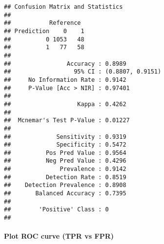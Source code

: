 \documentclass[
]{article}
\newenvironment{Shaded}{\begin{snugshade}}{\end{snugshade}}
\newcommand{\DataTypeTok}[1]{\textcolor[rgb]{0.13,0.29,0.53}{#1}}
\newcommand{\DecValTok}[1]{\textcolor[rgb]{0.00,0.00,0.81}{#1}}
\newcommand{\KeywordTok}[1]{\textcolor[rgb]{0.13,0.29,0.53}{\textbf{#1}}}
\newcommand{\NormalTok}[1]{#1}
\newcommand{\OperatorTok}[1]{\textcolor[rgb]{0.81,0.36,0.00}{\textbf{#1}}}
\newcommand{\OtherTok}[1]{\textcolor[rgb]{0.56,0.35,0.01}{#1}}
\newcommand{\StringTok}[1]{\textcolor[rgb]{0.31,0.60,0.02}{#1}}
\begin{document}
\begin{verbatim}
## Confusion Matrix and Statistics
## 
##           Reference
## Prediction    0    1
##          0 1053   48
##          1   77   58
##                                           
##                Accuracy : 0.8989          
##                  95% CI : (0.8807, 0.9151)
##     No Information Rate : 0.9142          
##     P-Value [Acc > NIR] : 0.97401         
##                                           
##                   Kappa : 0.4262          
##                                           
##  Mcnemar's Test P-Value : 0.01227         
##                                           
##             Sensitivity : 0.9319          
##             Specificity : 0.5472          
##          Pos Pred Value : 0.9564          
##          Neg Pred Value : 0.4296          
##              Prevalence : 0.9142          
##          Detection Rate : 0.8519          
##    Detection Prevalence : 0.8908          
##       Balanced Accuracy : 0.7395          
##                                           
##        'Positive' Class : 0               
## 
\end{verbatim}

\hypertarget{plot-roc-curve-tpr-vs-fpr}{%
\paragraph{Plot ROC curve (TPR vs
FPR)}\label{plot-roc-curve-tpr-vs-fpr}}

\begin{Shaded}
\end{Shaded}
\end{document}
